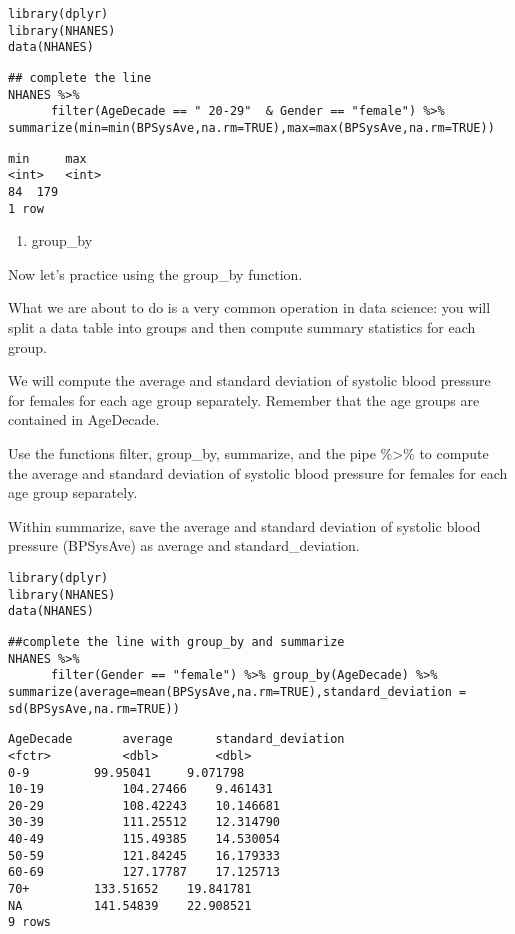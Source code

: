\documentclass[]{article}
\providecommand{\tightlist}{%
  \setlength{\itemsep}{0pt}\setlength{\parskip}{0pt}}
\begin{document}
\begin{verbatim}
library(dplyr)
library(NHANES)
data(NHANES)
\end{verbatim}

\begin{verbatim}
## complete the line
NHANES %>%
      filter(AgeDecade == " 20-29"  & Gender == "female") %>% summarize(min=min(BPSysAve,na.rm=TRUE),max=max(BPSysAve,na.rm=TRUE))
\end{verbatim}

\begin{verbatim}
min     max
<int>   <int>
84  179
1 row
\end{verbatim}

\begin{enumerate}
\def\labelenumi{\arabic{enumi}.}
\setcounter{enumi}{4}
\tightlist
\item
  group\_by
\end{enumerate}

Now let's practice using the group\_by function.

What we are about to do is a very common operation in data science: you
will split a data table into groups and then compute summary statistics
for each group.

We will compute the average and standard deviation of systolic blood
pressure for females for each age group separately. Remember that the
age groups are contained in AgeDecade.

Use the functions filter, group\_by, summarize, and the pipe
\%\textgreater{}\% to compute the average and standard deviation of
systolic blood pressure for females for each age group separately.

Within summarize, save the average and standard deviation of systolic
blood pressure (BPSysAve) as average and standard\_deviation.

\begin{verbatim}
library(dplyr)
library(NHANES)
data(NHANES)
\end{verbatim}

\begin{verbatim}
##complete the line with group_by and summarize
NHANES %>%
      filter(Gender == "female") %>% group_by(AgeDecade) %>% summarize(average=mean(BPSysAve,na.rm=TRUE),standard_deviation = sd(BPSysAve,na.rm=TRUE))
\end{verbatim}

\begin{verbatim}
AgeDecade       average      standard_deviation
<fctr>          <dbl>        <dbl>
0-9         99.95041     9.071798
10-19           104.27466    9.461431
20-29           108.42243    10.146681
30-39           111.25512    12.314790
40-49           115.49385    14.530054
50-59           121.84245    16.179333
60-69           127.17787    17.125713
70+         133.51652    19.841781
NA          141.54839    22.908521
9 rows
\end{verbatim}
\end{document}
